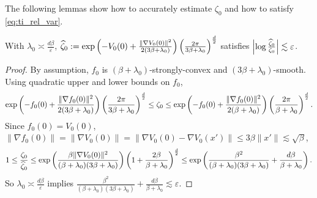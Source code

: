 The following lemmas show how to accurately estimate $\zeta_0$ and how to satisfy \cref{eq:ti_rel_var}.

\begin{lemma}
    With $\lambda_0\asymp\frac{d\beta}{\varepsilon}$, $\widehat{\zeta}_0:=\exp\left(-V_0(0)+\frac{\|\nabla V_0(0)\|^2}{2(3\beta+\lambda_0)}\right)\left(\frac{2\pi}{3\beta+\lambda_0}\right)^\frac{d}{2}$ satisfies $\left|\log\frac{\widehat{\zeta}_0}{\zeta_0}\right|\lesssim\varepsilon$.
    \label{lem:ti_est_zeta0}
\end{lemma}
\begin{proof}
    By assumption, $f_0$ is $(\beta+\lambda_0)$-strongly-convex and $(3\beta+\lambda_0)$-smooth. Using quadratic upper and lower bounds on $f_0$,
    \begin{align*}
        \exp\left(-f_0(0)+\frac{\|\nabla f_0(0)\|^2}{2(3\beta+\lambda_0)}\right)\left(\frac{2\pi}{3\beta+\lambda_0}\right)^\frac{d}{2}\le\zeta_0 \le\exp\left(-f_0(0)+\frac{\|\nabla f_0(0)\|^2}{2(\beta+\lambda_0)}\right)\left(\frac{2\pi}{\beta+\lambda_0}\right)^\frac{d}{2}.
    \end{align*}
    Since $f_0(0)=V_0(0)$, $\|\nabla f_0(0)\|=\|\nabla V_0(0)\|=\|\nabla V_0(0)-\nabla V_0(x')\|\le3\beta\|x'\|\lesssim\sqrt{\beta}$,
    \begin{align*}
        1\le\frac{\zeta_0}{\widehat{\zeta}_0}\le\exp\left(\frac{\beta\|\nabla V_0(0)\|^2}{(\beta+\lambda_0)(3\beta+\lambda_0)}\right)\left(1+\frac{2\beta}{\beta+\lambda_0}\right)^\frac{d}{2}\le\exp\left(\frac{\beta^2}{(\beta+\lambda_0)(3\beta+\lambda_0)}+\frac{d\beta}{\beta+\lambda_0}\right).
    \end{align*}
    So $\lambda_0\asymp\frac{d\beta}{\varepsilon}$ implies $\frac{\beta^2}{(\beta+\lambda_0)(3\beta+\lambda_0)}+\frac{d\beta}{\beta+\lambda_0}\lesssim\varepsilon$.
\end{proof}

